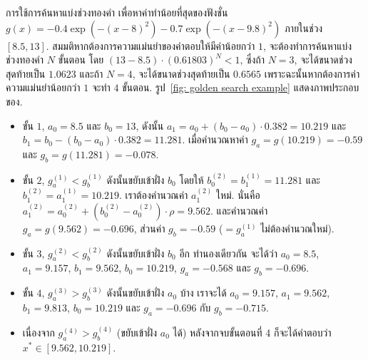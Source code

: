 \begin{myexample}
การใช้การค้นหาแบ่งช่วงทองคำ เพื่อหาค่าทำน้อยที่สุดของฟังชั่น $g(x) = -0.4 \exp(-(x-8)^2)-0.7 \exp(-(x-9.8)^2)$ ภายในช่วง $[8.5, 13]$.
สมมติหากต้องการความแม่นยำของคำตอบให้มีค่าน้อยกว่า $1$, จะต้องทำการค้นหาแบ่งช่วงทองคำ $N$ ขั้นตอน
โดย $(13 - 8.5) \cdot (0.61803)^N < 1$,
ซึ่งถ้า $N = 3$, จะได้ขนาดช่วงสุดท้ายเป็น $1.0623$ และถ้า $N = 4$, จะได้ขนาดช่วงสุดท้ายเป็น $0.6565$ เพราะฉะนั้นหากต้องการค่าความแม่นยำน้อยกว่า $1$ จะทำ $4$ ขั้นตอน.
รูป~\ref{fig: golden search example} แสดงภาพประกอบของ.

\begin{itemize}
\item ขั้น $1$, $a_0 = 8.5$ และ $b_0 = 13$, ดังนั้น $a_1 = a_0 + (b_0 - a_0) \cdot 0.382 = 10.219$ และ $b_1 = b_0 - (b_0 - a_0) \cdot 0.382 = 11.281$.
เมื่อคำนวณหาค่า $g_a = g(10.219) = -0.59$ และ $g_b = g(11.281) = -0.078$.

\item ขั้น $2$, $g_a^{(1)} < g_b^{(1)}$ ดังนั้นขยับเข้าฝั่ง $b_0$ โดยให้ $b_0^{(2)} = b_1^{(1)} = 11.281$ และ $b_1^{(2)} = a_1^{(1)} =10.219$.
เราต้องคำนวณค่า $a_1^{(2)}$ ใหม่. 
นั่นคือ $a_1^{(2)} = a_0^{(2)} + (b_0^{(2)} - a_0^{(2)}) \cdot \rho = 9.562$.
และคำนวณค่า $g_a = g(9.562) = -0.696$, ส่วนค่า $g_b = -0.59$ ($=g_a^{(1)}$ ไม่ต้องคำนวณใหม่).

\item ขั้น $3$, $g_a^{(2)} < g_b^{(2)}$ ดังนั้นขยับเข้าฝั่ง $b_0$ อีก 
ทำนองเดียวกัน จะได้ว่า $a_0 = 8.5$, $a_1 = 9.157$, $b_1 = 9.562$, $b_0 = 10.219$, 
$g_a = -0.568$ และ $g_b = -0.696$.

\item ขั้น $4$, $g_a^{(3)} > g_b^{(3)}$ ดังนั้นขยับเข้าฝั่ง $a_0$ บ้าง 
เราจะได้ $a_0 = 9.157$, $a_1 = 9.562$, $b_1 = 9.813$, $b_0 = 10.219$
และ $g_a = -0.696$ กับ $g_b = -0.715$.

\item เนื่องจาก $g_a^{(4)} > g_b^{(4)}$ (ขยับเข้าฝั่ง $a_0$ ได้) 
หลังจากจบขั้นตอนที่ 4 ก็จะได้คำตอบว่า $x^\ast \in [9.562, 10.219]$.

\end{itemize}


\end{myexample}

